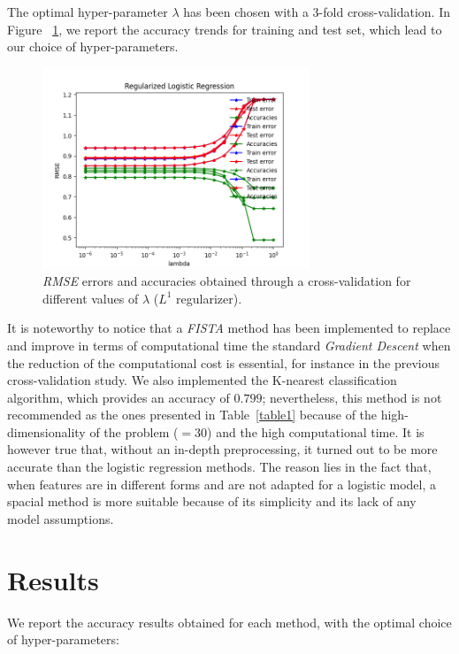 \documentclass[10pt,conference,compsocconf]{IEEEtran}
\begin{document}
The optimal hyper-parameter $\lambda$ has been chosen with a 3-fold cross-validation. In Figure ~\ref{reg_lambda}, we report the accuracy trends for training and test set, which lead to our choice of hyper-parameters.
\begin{center}
\vspace{-0.5cm}
\begin{figure}[h] 
		\includegraphics[width = 8cm]{reg_logistic_regression.png} 
	\caption{\emph{RMSE} errors and accuracies obtained through a cross-validation for different values of $\lambda$ ($L^1$ regularizer).}
	\label{reg_lambda}
\end{figure}
\vspace{-0.5cm}
\end{center}
It is noteworthy to notice that a \emph{FISTA} method has been implemented to replace and improve in terms of computational time the standard \emph{Gradient Descent} when the reduction of the computational cost is essential, for instance in the previous cross-validation study.
\newline
\newline
We also implemented the K-nearest classification algorithm, which provides an accuracy of $0.799$; nevertheless, this method is not recommended as the ones presented in Table~\ref{table1} because of the high-dimensionality of the problem ($=30$) and the high computational time. It is however true that, without an in-depth preprocessing, it turned out to be more accurate than the logistic regression methods. The reason lies in the fact that, when features are in different forms and are not adapted for a logistic model, a spacial method is more suitable because of its simplicity and its lack of any model assumptions.
\section{Results}
\label{results}
We report the accuracy results obtained for each method, with the optimal choice of hyper-parameters: \\
\end{document}
